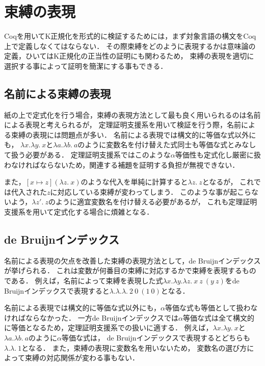 \documentclass[T]{compsoft}
\begin{document}
\section{束縛の表現}
Coqを用いてK正規化を形式的に検証するためには，まず対象言語の構文をCoq上で定義しなくてはならない．
その際束縛をどのように表現するかは意味論の定義，ひいてはK正規化の正当性の証明にも関わるため，
束縛の表現を適切に選択する事によって証明を簡潔にする事もできる．

\subsection{名前による束縛の表現}
紙の上で定式化を行う場合，束縛の表現方法として最も良く用いられるのは名前による表現と考えられるが，
定理証明支援系を用いて検証を行う際，名前による束縛の表現には問題点が多い．
名前による表現では構文的に等価な式以外にも，
$\lambda x.\lambda y.~x$と$\lambda a.\lambda b.~a$のように変数名を付け替えた式同士も等価な式とみなして扱う必要がある．
定理証明支援系ではこのような$\alpha$等価性も定式化し厳密に扱わなければならないため，関連する補題を証明する負担が無視できない．

また，$[x \mapsto z](\lambda z.~x)$のような代入を単純に計算すると$\lambda z.~z$となるが，
これでは代入された$z$に対応している束縛が変わってしまう．
このような事が起こらないよう，$\lambda z'.~z$のように適宜変数名を付け替える必要があるが，
これも定理証明支援系を用いて定式化する場合に煩雑となる．

\subsection{de Bruijnインデックス}
名前による表現の欠点を改善した束縛の表現方法として，de Bruijnインデックス\cite{Pierce:TypeSystems}が挙げられる．
これは変数が何番目の束縛に対応するかで束縛を表現するものである．
例えば，名前によって束縛を表現した式$\lambda x. \lambda y. \lambda z.~x~z~(y~z)$をde Bruijnインデックスで表現すると$\lambda. \lambda. \lambda.~2~0~(1~0)$となる．

名前による表現では構文的に等価な式以外にも，$\alpha$等価な式も等価として扱わなければならなかった．
一方de Bruijnインデックスでは$\alpha$等価な式は全て構文的に等価となるため，定理証明支援系での扱いに適する．
例えば，$\lambda x.\lambda y.~x$と$\lambda a.\lambda b.~a$のように$\alpha$等価な式は，
de Bruijnインデックスで表現するとどちらも$\lambda.\lambda.~1$となる．
また，束縛の表現に変数名を用いないため，
変数名の選び方によって束縛の対応関係が変わる事もない．
\end{document}
